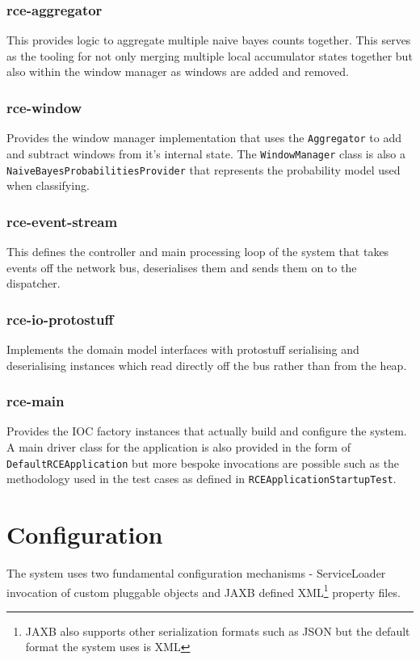 \documentclass[a4paper,11pt]{scrreprt}
\begin{document}
\subsubsection{rce-aggregator}
This provides logic to aggregate multiple naive bayes counts together. This serves as the tooling for not only merging multiple local accumulator states together but also within the window manager as windows are added and removed.

\subsubsection{rce-window}
Provides the window manager implementation that uses the \verb|Aggregator| to add and subtract windows from it's internal state. The \verb|WindowManager| class is also a\\ \verb|NaiveBayesProbabilitiesProvider| that represents the probability model used when classifying.

\subsubsection{rce-event-stream}
This defines the controller and main processing loop of the system that takes events off the network bus, deserialises them and sends them on to the dispatcher.

\subsubsection{rce-io-protostuff}
Implements the domain model interfaces with protostuff serialising and deserialising instances which read directly off the bus rather than from the heap.

\subsubsection{rce-main}
Provides the IOC factory instances that actually build and configure the system. A main driver class for the application is also provided in the form of \verb|DefaultRCEApplication| but more bespoke invocations are possible such as the methodology used in the test cases as defined in \verb|RCEApplicationStartupTest|.

\section{Configuration}
The system uses two fundamental configuration mechanisms - ServiceLoader invocation of custom pluggable objects and JAXB defined XML\footnote{JAXB also supports other serialization formats such as JSON but the default format the system uses is XML} property files.
\end{document}
